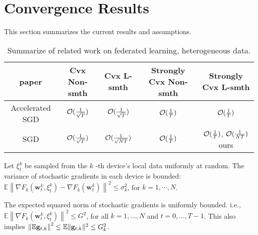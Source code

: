 


\section{Convergence Results}
This section summarizes the current results and assumptions.
\begin{table}[h!]
\centering
\small
	\begin{tabular}{|c|c|c|c|c|}\hline
		paper         &  Cvx Non-smth & Cvx L-smth & Strongly Cvx Non-smth& Strongly Cvx L-smth \\ \hline
	Accelerated	SGD   &   ${\mathcal{O}}(\frac{1}{\sqrt{T}})$     & ${\mathcal{O}}(\frac{1}{\sqrt{T}})$   &    ${\mathcal{O}}(\frac{1}{T})$   &  ${\mathcal{O}}(\frac{1}{T})$    \\\hline
	SGD    &    ${\mathcal{O}}(\frac{1}{\sqrt{T}})$  &   ${\mathcal{O}}(\frac{1}{\sqrt{NT}})$  &  ${\mathcal{O}}(\frac{1}{T})$  & ${\mathcal{O}}(\frac{1}{T})$\cite{li2019convergence,haddadpour2019convergence}, ${\mathcal{O}}(\frac{1}{NT})$ ours    \\\hline
	\end{tabular}
	\caption{Summarize of related work on federated learning, heterogeneous data.}
\end{table}


\begin{assumption}
Let $\xi_{t}^{k}$ be sampled from the $k$ -th device's local data uniformly at random. The variance of stochastic gradients in each device is bounded: $\mathbb{E}\left\|\nabla F_{k}\left(\mathbf{w}_{t}^{k}, \xi_{t}^{k}\right)-\nabla F_{k}\left(\mathbf{w}_{t}^{k}\right)\right\|^{2} \leq \sigma_{k}^{2}$,
for $k=1, \cdots, N$.	
\end{assumption}





\begin{assumption}
The expected squared norm of stochastic gradients is uniformly bounded. i.e.,
$\mathbb{E}\left\|\nabla F_{k}\left(\mathbf{w}_{t}^{k}, \xi_{t}^{k}\right)\right\|^{2} \leq G^{2}$, for all $k = 1,..., N$ and $t=0, \dots, T-1$. This also implies $\left\| \mathbb{E}{\mathbf{g}}_{t,k}\right\|^2  \leq \mathbb{E}\|{\mathbf{g}}_{t,k}\|^2 \leq G_k^2$.
\label{ass:subgrad2}
\end{assumption}

